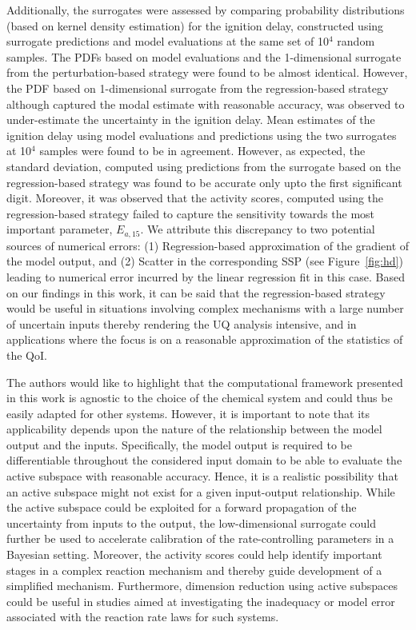 Additionally, the surrogates were assessed by comparing probability distributions (based on kernel density estimation)
for the ignition delay, constructed using surrogate predictions and model evaluations at the same set of 10$^4$
random samples. The PDFs based on model evaluations and the 1-dimensional surrogate from the perturbation-based
strategy were found to be almost identical. However, the PDF based on 1-dimensional surrogate from the
regression-based strategy although captured the modal estimate with reasonable accuracy, was observed to
under-estimate the uncertainty in the ignition delay. Mean estimates of the ignition delay using model evaluations
and predictions using the two surrogates at 10$^4$ samples were found to be in agreement. However, as expected, the
standard deviation, computed using predictions from the surrogate based on the regression-based strategy was
found to be accurate only upto the first significant digit. Moreover, it was observed that the activity scores,
computed using the regression-based strategy failed to capture the sensitivity towards the 
most important parameter, $E_{a,15}$. 
We attribute this discrepancy to two potential sources of numerical errors: (1) Regression-based approximation of the
gradient of the model output, and (2) Scatter in the corresponding SSP (see Figure~\ref{fig:hd}) leading to numerical
error incurred by the linear regression fit in this case. Based on our findings in this work, it can be said that
the regression-based strategy would be useful in situations involving complex mechanisms with a large number of
uncertain inputs thereby rendering the UQ analysis intensive, and in applications where the focus is on a
reasonable approximation of the statistics of the QoI. 
 
 The authors would like to highlight that the computational framework presented in this work is agnostic to the choice
 of the chemical system and could thus be easily adapted for other systems. However, it is important to note that
 its applicability depends upon the nature of the relationship between the model output and the inputs. Specifically,
 the model output is required to be differentiable throughout the considered input domain to be able to evaluate
 the active subspace with reasonable accuracy. Hence, it is a realistic possibility that an active subspace might not
 exist for a given input-output relationship. While the active subspace could be exploited for a forward propagation of
 the uncertainty from inputs to the output, the low-dimensional surrogate could further be used to accelerate 
 calibration of the rate-controlling parameters in a Bayesian setting. Moreover, the activity scores could help
 identify important stages in a complex reaction mechanism and thereby guide development of a simplified
 mechanism. Furthermore, dimension reduction using active subspaces could be useful in studies aimed at
 investigating the inadequacy or model error associated with the reaction rate laws for such systems.  
 
 
 
 
 
 
 
